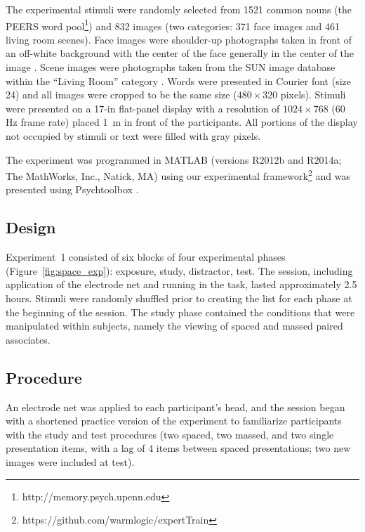 The experimental stimuli were randomly selected from 1521 common nouns (the PEERS word pool\footnote{http://memory.psych.upenn.edu})
and 832 images (two categories: 371 face images and 461 living room scenes).  Face images were shoulder-up photographs taken in front of an off-white background with the center of the face generally in the center of the image \cite{PhilEtal2000}.  Scene images were photographs taken from the SUN image database within the ``Living Room'' category \cite{XiaoEtal2010}.  Words were presented in Courier font (size 24) and all images were cropped to be the same size ($480\times320$ pixels).  Stimuli were presented on a 17-in flat-panel display with a resolution of $1024\times768$ (60 Hz frame rate) placed 1~m in front of the participants.  All portions of the display not occupied by stimuli or text were filled with gray pixels.

The experiment was programmed in MATLAB (versions R2012b and R2014a; The MathWorks, Inc., Natick, MA) using our experimental framework\footnote{https://github.com/warmlogic/expertTrain} and was presented using Psychtoolbox \cite{Brai1997}.

\subsection{Design}

Experiment~1 consisted of six blocks of four experimental phases (Figure~\ref{fig:space_exp}): exposure, study, distractor, test.  The session, including application of the electrode net and running in the task, lasted approximately 2.5 hours.  Stimuli were randomly shuffled prior to creating the list for each phase at the beginning of the session.  The study phase contained the conditions that were manipulated within subjects, namely the viewing of spaced and massed paired associates.

\subsection{Procedure}

An electrode net was applied to each participant's head, and the session began with a shortened practice version of the experiment to familiarize participants with the study and test procedures (two spaced, two massed, and two single presentation items, with a lag of 4 items between spaced presentations; two new images were included at test).

